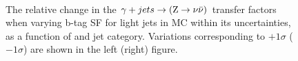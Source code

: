 \begin{figure}[!h]
  \centering
   ~~
  \\

  \caption{\label{fig:tfSyst_bsfl_gjToZinv} The relative change in the
  $\gj \rightarrow (\znunu)$ transfer
  factors when varying b-tag SF for light jets in MC within its uncertainties, as a function of \scalht and jet category. 
  Variations corresponding to $+1\sigma$ ($-1\sigma$) are shown in the left (right) figure. 
  }
\end{figure}

